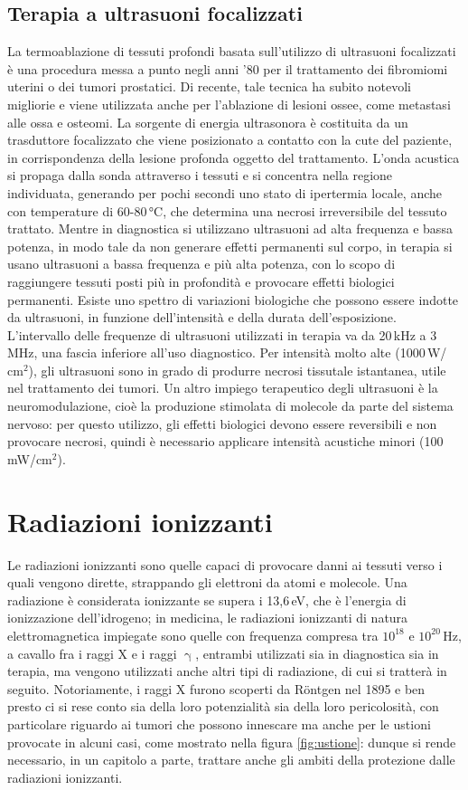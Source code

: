 \documentclass{report}
\newcommand{\figref}[1]{figura \ref{#1}}
\numberwithin{equation}{section}
\numberwithin{figure}{section}
\begin{document}
\section{Terapia a ultrasuoni focalizzati}
La termoablazione di tessuti profondi basata sull'utilizzo di ultrasuoni focalizzati è una procedura messa a punto negli anni '80 per il trattamento dei fibromiomi uterini o dei tumori prostatici. Di recente, tale tecnica ha subito notevoli migliorie e viene utilizzata anche per l'ablazione di lesioni ossee, come metastasi alle ossa e osteomi. La sorgente di energia ultrasonora è costituita da un trasduttore focalizzato che viene posizionato a contatto con la cute del paziente, in corrispondenza della lesione profonda oggetto del trattamento. L'onda acustica si propaga dalla sonda attraverso i tessuti e si concentra nella regione individuata, generando per pochi secondi uno stato di ipertermia locale, anche con temperature di 60-80\,°C, che determina una necrosi irreversibile del tessuto trattato. Mentre in diagnostica si utilizzano ultrasuoni ad alta frequenza e bassa potenza, in modo tale da non generare effetti permanenti sul corpo, in terapia si usano ultrasuoni a bassa frequenza e più alta potenza, con lo scopo di raggiungere tessuti posti più in profondità e provocare effetti biologici permanenti. Esiste uno spettro di variazioni biologiche che possono essere indotte da ultrasuoni, in funzione dell'intensità e della durata dell'esposizione. L'intervallo delle frequenze di ultrasuoni utilizzati in terapia va da 20\,kHz a 3\,MHz, una fascia inferiore all'uso diagnostico. Per intensità molto alte (1000\,W/$\text{cm}^2$), gli ultrasuoni sono in grado di produrre necrosi tissutale istantanea, utile nel trattamento dei tumori. Un altro impiego terapeutico degli ultrasuoni è la neuromodulazione, cioè la produzione stimolata di molecole da parte del sistema nervoso: per questo utilizzo, gli effetti biologici devono essere reversibili e non provocare necrosi, quindi è necessario applicare intensità acustiche minori (100\,mW/$\text{cm}^2$).

\chapter{Radiazioni ionizzanti}

Le radiazioni ionizzanti sono quelle capaci di provocare danni ai tessuti verso i quali vengono dirette, strappando gli elettroni da atomi e molecole. Una radiazione è considerata ionizzante se supera i 13,6\,eV, che è l'energia di ionizzazione dell'idrogeno; in medicina, le radiazioni ionizzanti di natura elettromagnetica impiegate sono quelle con frequenza compresa tra $10^{18}$ e $10^{20}$\,Hz, a cavallo fra i raggi X e i raggi $\upgamma$, entrambi utilizzati sia in diagnostica sia in terapia, ma vengono utilizzati anche altri tipi di radiazione, di cui si tratterà in seguito. Notoriamente, i raggi X furono scoperti da Röntgen nel 1895 e ben presto ci si rese conto sia della loro potenzialità sia della loro pericolosità, con particolare riguardo ai tumori che possono innescare ma anche per le ustioni provocate in alcuni casi, come mostrato nella \figref{fig:ustione}: dunque si rende necessario, in un capitolo a parte, trattare anche gli ambiti della protezione dalle radiazioni ionizzanti.
\end{document}
